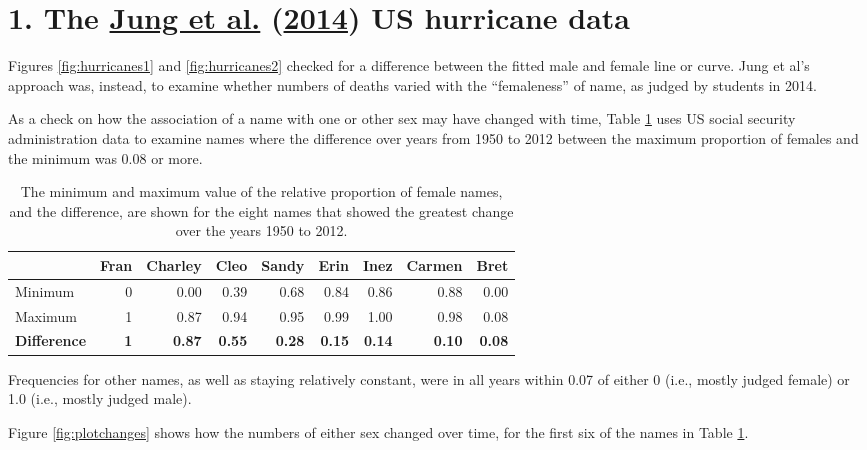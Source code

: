 \documentclass[
  10pt,
  b5paper]{book}
\begin{document}
\hypertarget{hurricanes}{%
\section*{\texorpdfstring{1. The \protect\hyperlink{ref-jung2014female}{Jung et al.} (\protect\hyperlink{ref-jung2014female}{2014}) US hurricane data}{1. The Jung et al. (2014) US hurricane data}}\label{hurricanes}}

Figures \ref{fig:hurricanes1} and \ref{fig:hurricanes2} checked
for a difference between the fitted male and female line or curve.
Jung et al's approach was, instead, to examine whether numbers of
deaths varied with the ``femaleness'' of name, as judged by students
in 2014.

As a check on how the association of a name with one or other sex
may have changed with time, Table \ref{tab:changetab} uses
US social security administration data to examine names where
the difference over years from 1950 to 2012 between the
maximum proportion of females and the minimum was 0.08 or more.

\begin{table}

\caption{\label{tab:changetab}The minimum and maximum value of the relative proportion
of female names, and the difference, are shown for the eight names
that showed the greatest change over the years 1950 to 2012.}
\centering
\fontsize{10}{12}\selectfont
\begin{tabular}[t]{l|r|r|r|r|r|r|r|r}
\hline
  & Fran & Charley & Cleo & Sandy & Erin & Inez & Carmen & Bret\\
\hline
Minimum & 0 & 0.00 & 0.39 & 0.68 & 0.84 & 0.86 & 0.88 & 0.00\\
\hline
Maximum & 1 & 0.87 & 0.94 & 0.95 & 0.99 & 1.00 & 0.98 & 0.08\\
\hline
\textbf{Difference} & \textbf{1} & \textbf{0.87} & \textbf{0.55} & \textbf{0.28} & \textbf{0.15} & \textbf{0.14} & \textbf{0.10} & \textbf{0.08}\\
\hline
\end{tabular}
\end{table}

Frequencies for other names, as well as staying relatively
constant, were in all years within 0.07 of either 0 (i.e.,
mostly judged female) or 1.0 (i.e., mostly judged male).

Figure \ref{fig:plotchanges} shows how the numbers of
either sex changed over time, for the first six of the
names in Table \ref{tab:changetab}.
\end{document}
